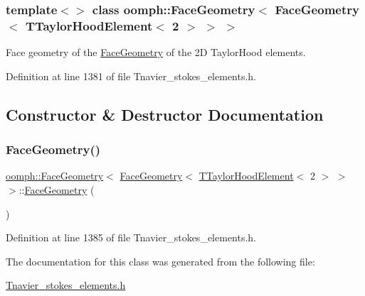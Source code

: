 \subsubsection*{template$<$$>$\newline
class oomph\+::\+Face\+Geometry$<$ Face\+Geometry$<$ T\+Taylor\+Hood\+Element$<$ 2 $>$ $>$ $>$}

Face geometry of the \hyperlink{classoomph_1_1FaceGeometry}{Face\+Geometry} of the 2D Taylor\+Hood elements. 

Definition at line 1381 of file Tnavier\+\_\+stokes\+\_\+elements.\+h.



\subsection{Constructor \& Destructor Documentation}
\mbox{\label{classoomph_1_1FaceGeometry_3_01FaceGeometry_3_01TTaylorHoodElement_3_012_01_4_01_4_01_4_abccafc37fc42acc1ed1bf79f52256838}} 
\subsubsection{\texorpdfstring{Face\+Geometry()}{FaceGeometry()}}
{\footnotesize\ttfamily \hyperlink{classoomph_1_1FaceGeometry}{oomph\+::\+Face\+Geometry}$<$ \hyperlink{classoomph_1_1FaceGeometry}{Face\+Geometry}$<$ \hyperlink{classoomph_1_1TTaylorHoodElement}{T\+Taylor\+Hood\+Element}$<$ 2 $>$ $>$ $>$\+::\hyperlink{classoomph_1_1FaceGeometry}{Face\+Geometry} (\begin{DoxyParamCaption}{ }\end{DoxyParamCaption})\hspace{0.3cm}{\ttfamily [inline]}}



Definition at line 1385 of file Tnavier\+\_\+stokes\+\_\+elements.\+h.



The documentation for this class was generated from the following file\+:\begin{DoxyCompactItemize}
\item 
\hyperlink{Tnavier__stokes__elements_8h}{Tnavier\+\_\+stokes\+\_\+elements.\+h}\end{DoxyCompactItemize}
